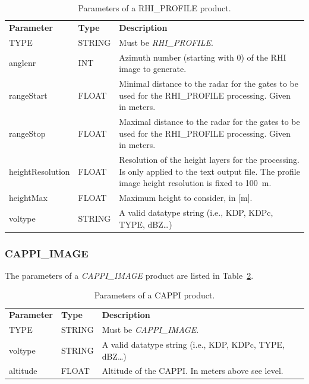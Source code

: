 \documentclass[a4paper,11pt,pdftex,twoside]{scrartcl}
\renewcommand{\bf}{\normalfont \bfseries}
\begin{document}
{{{\begin{table}[H]
 \begin{tabularx}{\textwidth}{llX}
 \bf{Parameter}  & \bf{Type}  & \bf{Description}\\
 TYPE           & STRING     & Must be \emph{RHI\_PROFILE}.\\
 anglenr        & INT        & Azimuth number (starting with 0) of the RHI image
                               to generate.\\
 rangeStart     & FLOAT      & Minimal distance to the radar for the gates to be used for the
                               RHI\_PROFILE processing. Given in meters.\\
 rangeStop      & FLOAT      & Maximal distance to the radar for the gates to be used for the
                               RHI\_PROFILE processing. Given in meters.\\
 heightResolution & FLOAT    & Resolution of the height layers for the processing. Is only
                               applied to the text output file. The profile image height
                               resolution is fixed to 100~m.\\
 heightMax & FLOAT    & Maximum height to consider, in [m].\\   
  voltype        & STRING     & A valid datatype string (i.e., KDP, KDPc, TYPE, dBZ\dots)\\
                           
 \end{tabularx}
 \caption{Parameters of a RHI\_PROFILE product.}
 \label{tab_product_rhi_profile}
 \end{table}

 \subsubsection{CAPPI\_IMAGE}
 \label{subsec_cappi_image}

The parameters of a \emph{CAPPI\_IMAGE} product are listed in Table~\ref{tab_product_cappi}.

 \begin{table}[H]
 \begin{tabularx}{\textwidth}{llX}
 \bf{Parameter}  & \bf{Type}  & \bf{Description}\\
 TYPE           & STRING     & Must be \emph{CAPPI\_IMAGE}.\\
  voltype        & STRING     & A valid datatype string (i.e., KDP, KDPc, TYPE, dBZ\dots)\\
 altitude       & FLOAT      & Altitude of the CAPPI. In meters above see level.\\
 \end{tabularx}
 \caption{Parameters of a CAPPI product.}
 \label{tab_product_cappi}
 \end{table}

}}}
\end{document}
